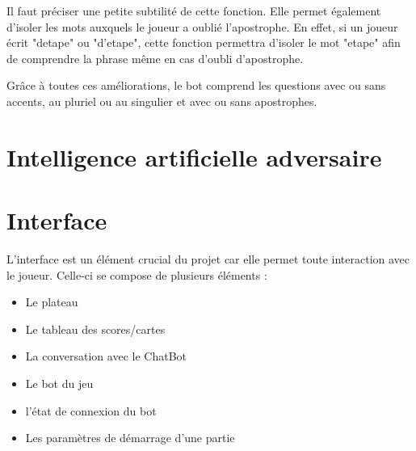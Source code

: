 \documentclass[a4paper, 11pt]{article}
\begin{document}
Il faut préciser une petite subtilité de cette fonction. Elle permet également d'isoler les mots auxquels le joueur a oublié l'apostrophe. En effet, si un joueur écrit "detape" ou "d'etape", cette fonction permettra d'isoler le mot "etape" afin de comprendre la phrase même en cas d'oubli d'apostrophe.\newline

Grâce à toutes ces améliorations, le bot comprend les questions avec ou sans accents, au pluriel ou au singulier et avec ou sans apostrophes.

\newpage

\section{Intelligence artificielle adversaire}

\newpage

\section{Interface}

L'interface est un élément crucial du projet car elle permet toute interaction avec le joueur. Celle-ci se compose de plusieurs éléments :
\begin{itemize}
    \item Le plateau
    \item Le tableau des scores/cartes
    \item La conversation avec le ChatBot
    \item Le bot du jeu
    \item l'état de connexion du bot
    \item Les paramètres de démarrage d'une partie
\end{itemize}
\end{document}
